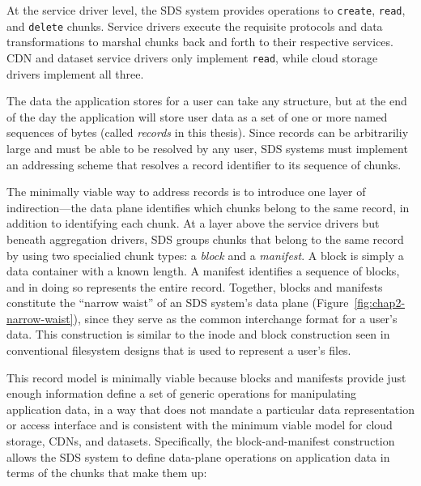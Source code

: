 At the service driver level, the SDS
system provides operations to \texttt{create}, \texttt{read}, and
\texttt{delete} chunks.  Service drivers execute the requisite protocols
and data transformations to
marshal chunks back and forth to their respective services.  CDN and dataset
service drivers only implement \texttt{read}, while cloud storage drivers
implement all three.

The data the application stores for a user can take any structure, but at the
end of the day the application will store user data as a set of one or more
named sequences of bytes (called \emph{records} in this thesis).  Since records
can be arbitrariliy large and must be able to be resolved by any user, SDS
systems must implement an addressing scheme that resolves a record identifier to
its sequence of chunks.

The minimally viable way to address records is to introduce one layer of
indirection---the data plane identifies which chunks belong to the same record,
in addition to identifying each chunk.
At a layer above the service drivers but beneath aggregation drivers, SDS
groups chunks that belong to the same record by using two specialied
chunk types:  a \emph{block} and a \emph{manifest}.  A block is simply a data
container with a known length.  A manifest identifies a sequence of blocks, and
in doing so represents the entire record.  Together, blocks and manifests
constitute the ``narrow waist'' of an SDS system's data plane
(Figure~\ref{fig:chap2-narrow-waist}), since they serve as the common
interchange format for a user's data.  This construction is similar to the
inode and block construction seen in conventional filesystem designs that is
used to represent a user's files.

This record model is minimally viable because blocks
and manifests provide just enough information define a
set of generic operations for manipulating application data, in a way that
does not mandate a particular data representation or access interface and is
consistent with the minimum viable model for cloud storage, CDNs, and datasets.
Specifically, the block-and-manifest construction allows
the SDS system to define data-plane operations on
application data in terms of the chunks that make them up:

